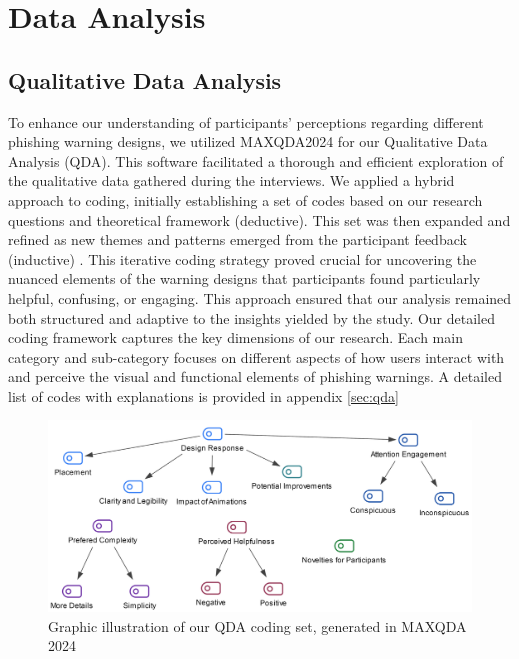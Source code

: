 \documentclass[
  a4paper,  %
  twoside,  %
  bibliography=totoc,
  headsepline,
  cleardoublepage=empty,
  parskip=half,
  draft=false
]{scrbook}
\begin{document}
\section{Data Analysis}
\subsection{Qualitative Data Analysis}
To enhance our understanding of participants' perceptions regarding different phishing warning designs, we utilized MAXQDA2024 for our Qualitative Data Analysis (QDA). This software facilitated a thorough and efficient exploration of the qualitative data gathered during the interviews. \newline
We applied a hybrid approach to coding, initially establishing a set of codes based on our research questions and theoretical framework (deductive). This set was then expanded and refined as new themes and patterns emerged from the participant feedback (inductive) \cite{qda}. This iterative coding strategy proved crucial for uncovering the nuanced elements of the warning designs that participants found particularly helpful, confusing, or engaging. This approach ensured that our analysis remained both structured and adaptive to the insights yielded by the study. \newline
Our detailed coding framework captures the key dimensions of our research. Each main category and sub-category focuses on different aspects of how users interact with and perceive the visual and functional elements of phishing warnings. A detailed list of codes with explanations is provided in appendix \ref{sec:qda}

\begin{figure} [ht]
    \centering
    \includegraphics[width=1\linewidth]{figures/coding.png}
    \caption{Graphic illustration of our QDA coding set, generated in MAXQDA 2024}
    \label{fig:qda}
\end{figure}
\end{document}
